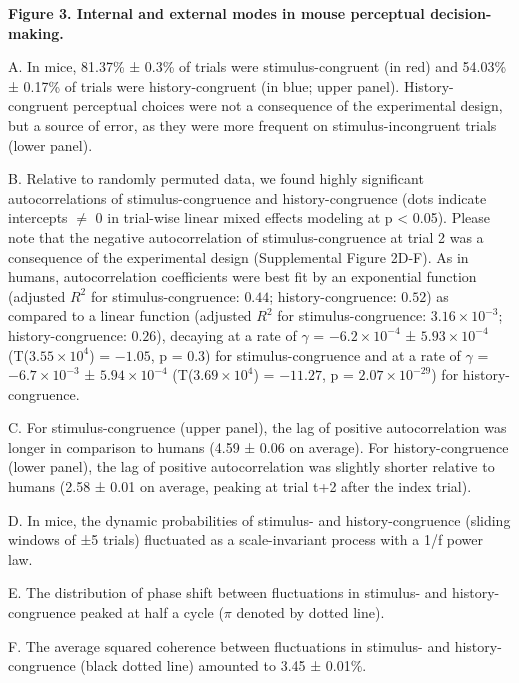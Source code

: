\documentclass[
]{article}
\begin{document}
\textbf{Figure 3. Internal and external modes in mouse perceptual
decision-making.}

A. In mice, 81.37\% ± 0.3\% of trials were stimulus-congruent (in red)
and 54.03\% ± 0.17\% of trials were history-congruent (in blue; upper
panel). History-congruent perceptual choices were not a consequence of
the experimental design, but a source of error, as they were more
frequent on stimulus-incongruent trials (lower panel).

B. Relative to randomly permuted data, we found highly significant
autocorrelations of stimulus-congruence and history-congruence (dots
indicate intercepts \(\neq\) 0 in trial-wise linear mixed effects
modeling at p \textless{} 0.05). Please note that the negative
autocorrelation of stimulus-congruence at trial 2 was a consequence of
the experimental design (Supplemental Figure 2D-F). As in humans,
autocorrelation coefficients were best fit by an exponential function
(adjusted \(R^2\) for stimulus-congruence: \(0.44\); history-congruence:
\(0.52\)) as compared to a linear function (adjusted \(R^2\) for
stimulus-congruence: \(\ensuremath{3.16\times 10^{-3}}\);
history-congruence: \(0.26\)), decaying at a rate of \(\gamma\) =
\(\ensuremath{-6.2\times 10^{-4}}\) ±
\(\ensuremath{5.93\times 10^{-4}}\)
(T(\(\ensuremath{3.55\times 10^{4}}\)) = \(-1.05\), p = \(0.3\)) for
stimulus-congruence and at a rate of \(\gamma\) =
\(\ensuremath{-6.7\times 10^{-3}}\) ±
\(\ensuremath{5.94\times 10^{-4}}\)
(T(\(\ensuremath{3.69\times 10^{4}}\)) = \(-11.27\), p =
\(\ensuremath{2.07\times 10^{-29}}\)) for history-congruence.

C. For stimulus-congruence (upper panel), the lag of positive
autocorrelation was longer in comparison to humans (4.59 ± 0.06 on
average). For history-congruence (lower panel), the lag of positive
autocorrelation was slightly shorter relative to humans (2.58 ± 0.01 on
average, peaking at trial t+2 after the index trial).

D. In mice, the dynamic probabilities of stimulus- and
history-congruence (sliding windows of ±5 trials) fluctuated as a
scale-invariant process with a 1/f power law.

E. The distribution of phase shift between fluctuations in stimulus- and
history-congruence peaked at half a cycle (\(\pi\) denoted by dotted
line).

F. The average squared coherence between fluctuations in stimulus- and
history-congruence (black dotted line) amounted to 3.45 ± 0.01\%.
\end{document}
